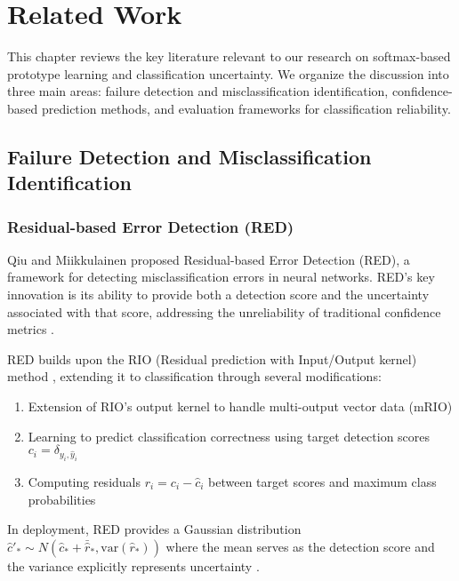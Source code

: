 
\chapter{Related Work}
\label{related_work}

This chapter reviews the key literature relevant to our research on softmax-based prototype learning and classification uncertainty. We organize the discussion into three main areas: failure detection and misclassification identification, confidence-based prediction methods, and evaluation frameworks for classification reliability.

\section{Failure Detection and Misclassification Identification}

\subsection{Residual-based Error Detection (RED)}

Qiu and Miikkulainen \cite{QiuMiikkulainen2022} proposed Residual-based Error Detection (RED), a framework for detecting misclassification errors in neural networks. RED's key innovation is its ability to provide both a detection score and the uncertainty associated with that score, addressing the unreliability of traditional confidence metrics \cite{Provost1998}.

RED builds upon the RIO (Residual prediction with Input/Output kernel) method \cite{Qiu2020}, extending it to classification through several modifications:
\begin{enumerate}
    \item Extension of RIO's output kernel to handle multi-output vector data (mRIO)
    \item Learning to predict classification correctness using target detection scores $c_i = \delta_{y_i,\hat{y}_i}$
    \item Computing residuals $r_i = c_i - \hat{c}_i$ between target scores and maximum class probabilities
\end{enumerate}

In deployment, RED provides a Gaussian distribution $\hat{c}'_* \sim N(\hat{c}_* + \bar{\hat{r}}_*, \text{var}(\hat{r}_*))$ where the mean serves as the detection score and the variance explicitly represents uncertainty \cite{QiuMiikkulainen2022}.

